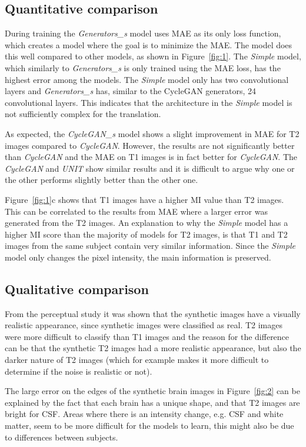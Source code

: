 \documentclass{article}
\begin{document}
\subsection{Quantitative comparison}

During training the \emph{Generators\_s} model uses MAE as its only loss function, which creates a model where the goal is to minimize the MAE. The model does this well compared to other models, as shown in Figure~\ref{fig:1}. The \emph{Simple} model, which similarly to \emph{Generators\_s} is only trained using the MAE loss, has the highest error among the models. The \emph{Simple} model only has two convolutional layers and \emph{Generators\_s} has, similar to the CycleGAN generators, 24 convolutional layers. This indicates that the architecture in the \emph{Simple} model is not sufficiently complex for the translation. 

As expected, the \emph{CycleGAN\_s} model shows a slight improvement in MAE for T2 images compared to \emph{CycleGAN}. However, the results are not significantly better than \emph{CycleGAN} and the MAE on T1 images is in fact better for \emph{CycleGAN}. The \emph{CycleGAN} and \emph{UNIT} show similar results and it is difficult to argue why one or the other performs slightly better than the other one.

Figure~\ref{fig:1}c shows that T1 images have a higher MI value than T2 images. This can be correlated to the results from MAE where a larger error was generated from the T2 images. An explanation to why the \emph{Simple} model has a higher MI score than the majority of models for T2 images, is that T1 and T2 images from the same subject contain very similar information. Since the \emph{Simple} model only changes the pixel intensity, the main information is preserved.


\subsection{Qualitative comparison}

From the perceptual study it was shown that the synthetic images have a visually realistic appearance, since synthetic images were classified as real. T2 images were more difficult to classify than T1 images and the reason for the difference can be that the synthetic T2 images had a more realistic appearance, but also the darker nature of T2 images (which for example makes it more difficult to determine if the noise is realistic or not).

The large error on the edges of the synthetic brain images in Figure~\ref{fig:2} can be explained by the fact that each brain has a unique shape, and that T2 images are bright for CSF. Areas where there is an intensity change, e.g. CSF and white matter, seem to be more difficult for the models to learn, this might also be due to differences between subjects.
\end{document}
